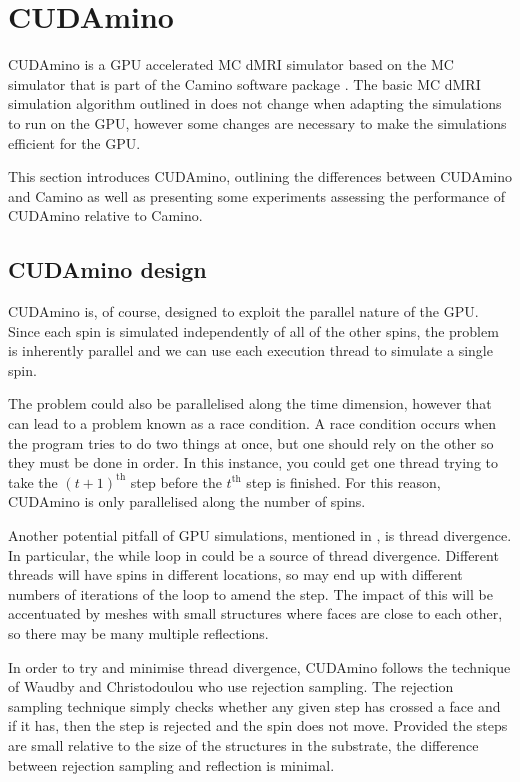 \chapter{CUDAmino}
\label{sec:cudamino}

CUDAmino is a GPU accelerated \acf{MC} dMRI simulator based on the \ac{MC} simulator that is part of the Camino software package \cite{Cook2006,Hall2009}. 
The basic \acl{MC} \ac{dMRI} simulation algorithm outlined in  does not change when adapting the simulations to run on the \ac{GPU}, however some changes are necessary to make the simulations efficient for the \ac{GPU}.

This section introduces CUDAmino, outlining the differences between CUDAmino and Camino as well as presenting some experiments assessing the performance of CUDAmino relative to Camino.

\section{CUDAmino design}
\label{sec:cudamino_design}
CUDAmino is, of course, designed to exploit the parallel nature of the \ac{GPU}.
Since each spin is simulated independently of all of the other spins, the problem is inherently parallel and we can use each execution thread to simulate a single spin.

The problem could also be parallelised along the time dimension, however that can lead to a problem known as a race condition.
A race condition occurs when the program tries to do two things at once, but one should rely on the other so they must be done in order.
In this instance, you could get one thread trying to take the $(t+1)^{\mathrm{th}}$ step before the $t^{\mathrm{th}}$ step is finished.
For this reason, CUDAmino is only parallelised along the number of spins.

Another potential pitfall of GPU simulations, mentioned in , is thread divergence.
In particular, the while loop in  could be a source of thread divergence.
Different threads will have spins in different locations, so may end up with different numbers of iterations of the loop to amend the step.
The impact of this will be accentuated by meshes with small structures where faces are close to each other, so there may be many multiple reflections.

In order to try and minimise thread divergence, CUDAmino follows the technique of Waudby and Christodoulou \cite{Waudby2011} who use rejection sampling.
The rejection sampling technique simply checks whether any given step has crossed a face and if it has, then the step is rejected and the spin does not move.
Provided the steps are small relative to the size of the structures in the substrate, the difference between rejection sampling and reflection is minimal\cite{Johannesson1996}.

